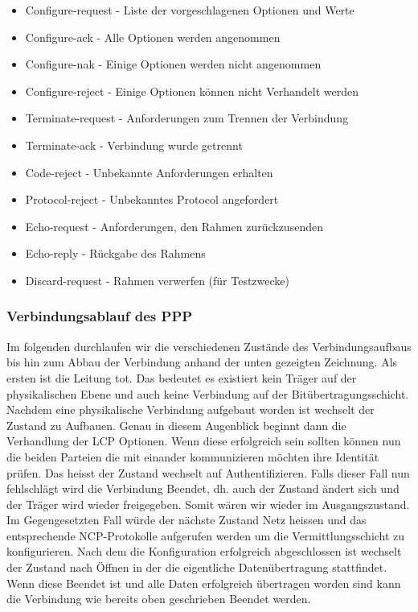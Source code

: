 \documentclass[12pt, a4paper, ngerman]{article}
\begin{document}
\begin{itemize}
	\item Configure-request	- Liste der vorgeschlagenen Optionen und Werte
	\item Configure-ack		- Alle Optionen werden angenommen
	\item	Configure-nak		- Einige Optionen werden nicht angenommen
	\item Configure-reject	- Einige Optionen können nicht Verhandelt werden
	\item Terminate-request	- Anforderungen zum Trennen der Verbindung
	\item Terminate-ack		- Verbindung wurde getrennt
	\item Code-reject		- Unbekannte Anforderungen erhalten
	\item Protocol-reject		- Unbekanntes Protocol angefordert
	\item Echo-request		- Anforderungen, den Rahmen zurückzusenden
	\item Echo-reply		- Rückgabe des Rahmens
	\item	Discard-request	- Rahmen verwerfen (für Testzwecke)
\end{itemize} 



\subsubsection{Verbindungsablauf des PPP}

Im folgenden durchlaufen wir die verschiedenen Zustände des Verbindungsaufbaus bis hin zum Abbau der Verbindung anhand der unten gezeigten Zeichnung.
Als ersten ist die Leitung tot. Das bedeutet es existiert kein Träger auf der physikalischen Ebene und auch keine Verbindung auf der Bitübertragungsschicht.
Nachdem eine physikalische Verbindung aufgebaut worden ist wechselt der Zustand zu Aufbauen. Genau in diesem Augenblick beginnt dann die Verhandlung der LCP Optionen. Wenn diese erfolgreich sein sollten können nun die beiden Parteien die mit einander kommunizieren möchten ihre Identität prüfen. Das heisst der Zustand wechselt auf Authentifizieren. Falls dieser Fall nun fehlschlägt wird die Verbindung Beendet, dh. auch der Zustand ändert sich und der Träger wird wieder freigegeben. Somit wären wir wieder im Ausgangszustand. Im Gegengesetzten Fall würde der nächste Zustand Netz heissen und das entsprechende NCP-Protokolle aufgerufen werden um die Vermittlungsschicht zu konfigurieren. Nach dem die Konfiguration erfolgreich abgeschlossen ist wechselt der Zustand nach Öffnen in der die eigentliche Datenübertragung stattfindet. Wenn diese Beendet ist und alle Daten erfolgreich übertragen worden sind kann die Verbindung wie bereits oben geschrieben Beendet werden.
\end{document}

